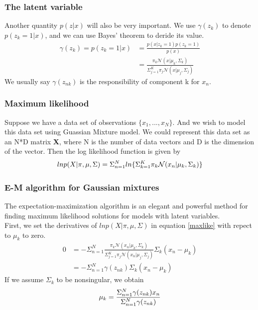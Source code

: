 \documentclass{beamer}
\begin{document}
\begin{frame}
\frametitle{The latent variable}
Another quantity $p(z|x)$ will also be very important. We use $\gamma (z_k)$ to denote $p(z_k=1|x)$, and we can use Bayes' theorem to deride its value.
\begin{equation}
\begin{split}
\gamma (z_k) = p(z_k=1|x) 
&= \frac{p(x|z_k=1)p(z_k=1)}{p(x)} \\
&= \frac{\pi_k\mathcal{N}(x|\mu_k, \Sigma_k)}{\Sigma^K_{j=1}\pi_j\mathcal{N}(x|\mu_j,\Sigma_j)}
\end{split}
\end{equation}
We usually say $\gamma(z_{nk})$ is the responsibility of component k for $x_n$.
\end{frame}

\begin{frame}
\frametitle{Maximum likelihood}
Suppose we have a data set of observations $\{x_1,...,x_N\}$. And we wish to model this data set using Guassian Mixture model. We could represent this data set as an N*D matrix \textbf{X}, where N is the number of data vectors and D is the dimension of the vector. Then the log likelihood function is given by
\begin{equation}{\label{maxlike}}
lnp(X|\pi,\mu,\Sigma)=\Sigma^N_{n=1}ln\{\Sigma^K_{k=1}\pi_k
\mathcal{N}(x_n|\mu_k,\Sigma_k)\}
\end{equation}
\end{frame}

\begin{frame}
\frametitle{E-M algorithm for Gaussian mixtures}
The expectation-maximization algorithm is an elegant and powerful method for finding maximum likelihood solutions for models with latent variables.\\
First, we set the derivatives of $lnp(X|\pi,\mu,\Sigma)$ in equation \ref{maxlike} with repect to $\mu_k$ to zero.
\begin{equation}
\begin{split}
0&=-\Sigma^N_{n=1}\frac{\pi_k\mathcal{N}(x_n|\mu_k,\Sigma_k)}{\Sigma^K_{j=1}\pi_j
\mathcal{N}(x_n|\mu_j,\Sigma_j)}\Sigma_k(x_n-\mu_k)\\
&=-\Sigma^N_{n=1}\gamma(z_{nk})\Sigma_k(x_n-\mu_k)
\end{split}
\end{equation}
If we assume $\Sigma_k$ to be nonsingular, we obtain
\begin{equation}{\label{m1}}
\mu_k=\frac{\Sigma^{N}_{n=1}\gamma(z_{nk})x_n}{\Sigma^{N}_{n=1}\gamma(z_{nk})}
\end{equation}
\end{frame}
\end{document}

